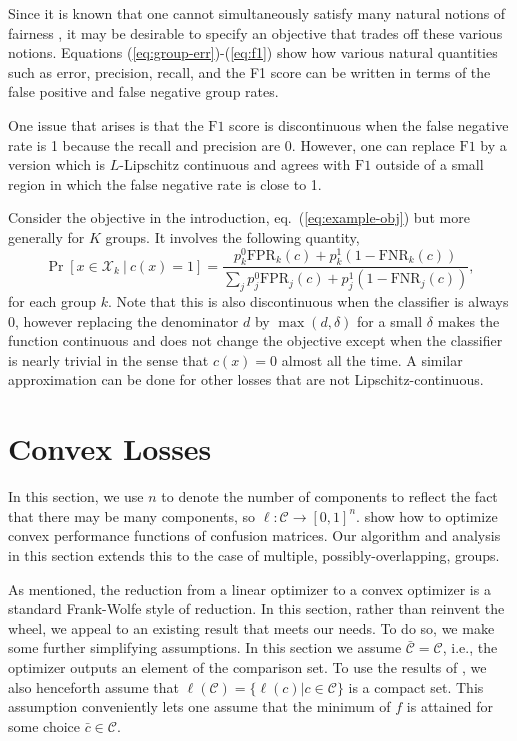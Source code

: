 \documentclass[final, 12pt]{colt2018} %
\def\calC{\mathcal{C}}
\def\calX{\mathcal{X}}
\def\FONE{\mathrm{F1}}
\def\FPR{\mathrm{FPR}}
\def\FNR{\mathrm{FNR}}
\begin{document}
Since it is known that one cannot simultaneously satisfy many natural notions of fairness \citep{Chouldechova17,KleinbergMR17}, it may be desirable to specify an objective that trades off these various notions.  
Equations (\ref{eq:group-err})-(\ref{eq:f1}) show how various natural quantities such as error, precision, recall, and the F1 score can be written in terms of the false positive and false negative group rates. 

One issue that arises is that the $\FONE$ score is discontinuous when the false negative rate is 1 because the recall and precision are 0.   However, one can replace $\FONE$ by a version which is $L$-Lipschitz continuous and agrees with $\FONE$ outside of a small region in which the false negative rate is close to 1. 

Consider the objective in the introduction, eq.~(\ref{eq:example-obj}) but more generally for $K$ groups. It involves the following quantity,
$$\Pr[x \in \calX_k~|~c(x)=1]=\frac{p_k^0\FPR_k(c)+p_k^1(1-\FNR_k(c))}{\sum_{j}p_j^0\FPR_j(c)+p_j^1(1-\FNR_j(c))},$$
for each group $k$. Note that this is also discontinuous when the classifier is always 0, however replacing the denominator $d$ by $\max(d, \delta)$ for a small $\delta$ makes the function continuous and does not change the objective except when the classifier is nearly trivial in the sense that $c(x)=0$ almost all the time. A similar approximation can be done for other losses that are not Lipschitz-continuous.


\section{Convex Losses}\label{sec:convex}


In this section, we use $n$ to denote the number of components to reflect the fact that there may be many components, so $\ell:\calC\rightarrow [0,1]^n$. \cite{NarasimhanRS015} show how to optimize convex performance functions of confusion matrices. Our algorithm and analysis in this section extends this to the case of multiple, possibly-overlapping, groups.

As mentioned, the reduction from a linear optimizer to a convex optimizer is a standard Frank-Wolfe style of reduction. In this section, rather than reinvent the wheel, we appeal to an existing result that meets our needs. To do so, we make some further simplifying assumptions.
In this section we assume $\bar{\calC}= \calC$, i.e., the optimizer outputs an element of the comparison set. To use the results of \cite{KakadeKL09}, we also henceforth assume that $\ell(\calC)=\{\ell(c)|c \in \calC\}$ is a compact set. This assumption conveniently lets one assume that the minimum of $f$ is attained for some choice $\bar{c} \in \calC$.
\end{document}
